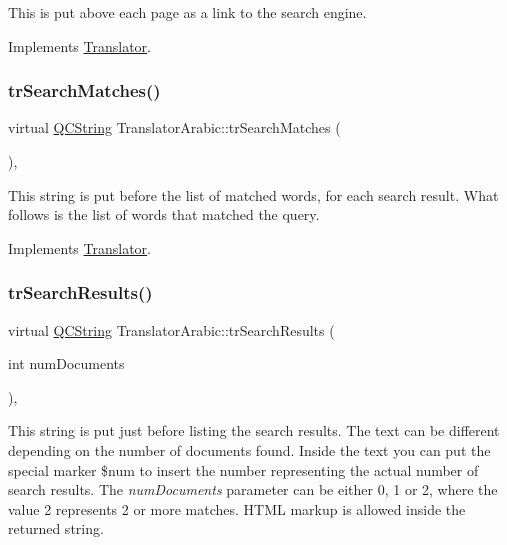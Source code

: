 This is put above each page as a link to the search engine. 

Implements \mbox{\hyperlink{class_translator}{Translator}}.

\mbox{\label{class_translator_arabic_ad66d22bab94edf3ea99999c5348e8ab0}} 
\subsubsection{\texorpdfstring{trSearchMatches()}{trSearchMatches()}}
{\footnotesize\ttfamily virtual \mbox{\hyperlink{class_q_c_string}{Q\+C\+String}} Translator\+Arabic\+::tr\+Search\+Matches (\begin{DoxyParamCaption}{ }\end{DoxyParamCaption})\hspace{0.3cm}{\ttfamily [inline]}, {\ttfamily [virtual]}}

This string is put before the list of matched words, for each search result. What follows is the list of words that matched the query. 

Implements \mbox{\hyperlink{class_translator}{Translator}}.

\mbox{\label{class_translator_arabic_adf073ad76dbfbcad593352948d763937}} 
\subsubsection{\texorpdfstring{trSearchResults()}{trSearchResults()}}
{\footnotesize\ttfamily virtual \mbox{\hyperlink{class_q_c_string}{Q\+C\+String}} Translator\+Arabic\+::tr\+Search\+Results (\begin{DoxyParamCaption}\item[{int}]{num\+Documents }\end{DoxyParamCaption})\hspace{0.3cm}{\ttfamily [inline]}, {\ttfamily [virtual]}}

This string is put just before listing the search results. The text can be different depending on the number of documents found. Inside the text you can put the special marker \$num to insert the number representing the actual number of search results. The {\itshape num\+Documents} parameter can be either 0, 1 or 2, where the value 2 represents 2 or more matches. H\+T\+ML markup is allowed inside the returned string. 

